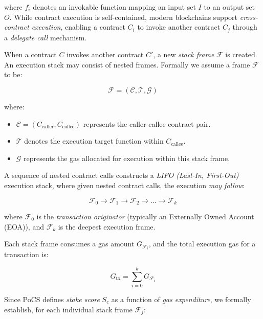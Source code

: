 \documentclass{article}
\begin{document}
where \( f_i \) denotes an invokable function mapping an input set \( I \) to an output set \( O \). While contract execution is self-contained, modern blockchains support \textit{cross-contract execution}, enabling a contract \( C_i \) to invoke another contract \( C_j \) through a \textit{delegate call} mechanism.  

When a contract \( C \) invokes another contract \( C' \), a new \textit{stack frame} \( \mathcal{F} \) is created. An execution stack may consist of nested frames. Formally we assume a frame $\mathcal{F}$ to be:

\begin{equation}
\mathcal{F} = (\mathcal{C}, \mathcal{T}, \mathcal{G})
\end{equation}

where:
\begin{itemize}
    \item \( \mathcal{C} = (C_{\text{caller}}, C_{\text{callee}}) \) represents the caller-callee contract pair.
    \item \( \mathcal{T} \) denotes the execution target function within \( C_{\text{callee}} \).
    \item \( \mathcal{G} \) represents the gas allocated for execution within this stack frame.
\end{itemize}

A sequence of nested contract calls constructs a \textit{LIFO (Last-In, First-Out)} execution stack, where given nested contract calls, the execution \textit{may follow}:

\begin{equation}
\mathcal{F}_0 \to \mathcal{F}_1 \to \mathcal{F}_2 \to \dots \to \mathcal{F}_k
\end{equation}

where \( \mathcal{F}_0 \) is the \textit{transaction originator} (typically an Externally Owned Account (EOA)), and \( \mathcal{F}_k \) is the deepest execution frame.

Each stack frame consumes a gas amount \( G_{\mathcal{F}_i} \), and the total execution gas for a transaction is:

\begin{equation}
G_{\text{tx}} = \sum_{i=0}^{k} G_{\mathcal{F}_i}
\end{equation}

Since PoCS defines \textit{stake score} \( S_c \) as a function of \textit{gas expenditure}, we formally establish, for each individual stack frame $\mathcal{F}_j$:
\end{document}
